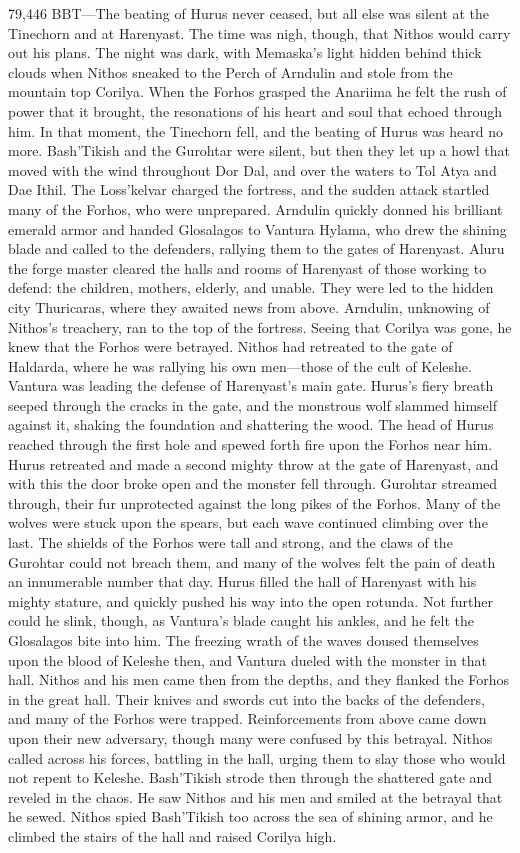 \documentclass[smalldemyvopaper,11pt,twoside,onecolumn,openright,extrafontsizes]{memoir}
\begin{document}
{{79,446 BBT—The beating of Hurus never ceased, but all else was silent at the Tinechorn and at Harenyast. The time was nigh, though, that Nithos would carry out his plans. The night was dark, with Memaska’s light hidden behind thick clouds when Nithos sneaked to the Perch of Arndulin and stole from the mountain top Corilya. When the Forhos grasped the Anariima he felt the rush of power that it brought, the resonations of his heart and soul that echoed through him. In that moment, the Tinechorn fell, and the beating of Hurus was heard no more. Bash’Tikish and the Gurohtar were silent, but then they let up a howl that moved with the wind throughout Dor Dal, and over the waters to Tol Atya and Dae Ithil. The Loss’kelvar charged the fortress, and the sudden attack startled many of the Forhos, who were unprepared. Arndulin quickly donned his brilliant emerald armor and handed Glosalagos to Vantura Hylama, who drew the shining blade and called to the defenders, rallying them to the gates of Harenyast. Aluru the forge master cleared the halls and rooms of Harenyast of those working to defend: the children, mothers, elderly, and unable. They were led to the hidden city Thuricaras, where they awaited news from above. Arndulin, unknowing of Nithos’s treachery, ran to the top of the fortress. Seeing that Corilya was gone, he knew that the Forhos were betrayed. Nithos had retreated to the gate of Haldarda, where he was rallying his own men—those of the cult of Keleshe. Vantura was leading the defense of Harenyast’s main gate. Hurus’s fiery breath seeped through the cracks in the gate, and the monstrous wolf slammed himself against it, shaking the foundation and shattering the wood. The head of Hurus reached through the first hole and spewed forth fire upon the Forhos near him. Hurus retreated and made a second mighty throw at the gate of Harenyast, and with this the door broke open and the monster fell through. Gurohtar streamed through, their fur unprotected against the long pikes of the Forhos. Many of the wolves were stuck upon the spears, but each wave continued climbing over the last. The shields of the Forhos were tall and strong, and the claws of the Gurohtar could not breach them, and many of the wolves felt the pain of death an innumerable number that day. Hurus filled the hall of Harenyast with his mighty stature, and quickly pushed his way into the open rotunda. Not further could he slink, though, as Vantura’s blade caught his ankles, and he felt the Glosalagos bite into him. The freezing wrath of the waves doused themselves upon the blood of Keleshe then, and Vantura dueled with the monster in that hall. Nithos and his men came then from the depths, and they flanked the Forhos in the great hall. Their knives and swords cut into the backs of the defenders, and many of the Forhos were trapped. Reinforcements from above came down upon their new adversary, though many were confused by this betrayal. Nithos called across his forces, battling in the hall, urging them to slay those who would not repent to Keleshe. Bash’Tikish strode then through the shattered gate and reveled in the chaos. He saw Nithos and his men and smiled at the betrayal that he sewed. Nithos spied Bash’Tikish too across the sea of shining armor, and he climbed the stairs of the hall and raised Corilya high. }}
\end{document}
